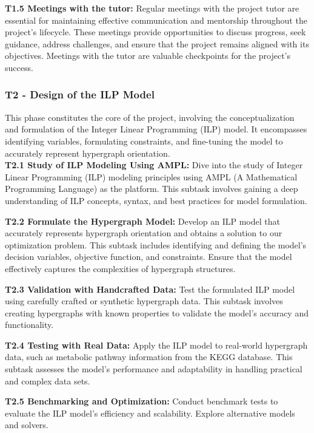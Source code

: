         \textbf{T1.5 Meetings with the tutor:}
        Regular meetings with the project tutor are essential for maintaining effective communication and mentorship throughout the project's lifecycle. These meetings provide opportunities to discuss progress, seek guidance, address challenges, and ensure that the project remains aligned with its objectives. Meetings with the tutor are valuable checkpoints for the project's success.
        

    \subsubsection{T2 - Design of the ILP Model}
        This phase constitutes the core of the project, involving the conceptualization and formulation of the Integer Linear Programming (ILP) model. It encompasses identifying variables, formulating constraints, and fine-tuning the model to accurately represent hypergraph orientation.\\
        
        \textbf{T2.1 Study of ILP Modeling Using AMPL:}
        Dive into the study of Integer Linear Programming (ILP) modeling principles using AMPL (A Mathematical Programming Language) as the platform. This subtask involves gaining a deep understanding of ILP concepts, syntax, and best practices for model formulation.
        
        \textbf{T2.2 Formulate the Hypergraph Model:}
        Develop an ILP model that accurately represents hypergraph orientation and obtains a solution to our optimization problem. This subtask includes identifying and defining the model's decision variables, objective function, and constraints. Ensure that the model effectively captures the complexities of hypergraph structures.
        
        \textbf{T2.3 Validation with Handcrafted Data:}
        Test the formulated ILP model using carefully crafted or synthetic hypergraph data. This subtask involves creating hypergraphs with known properties to validate the model's accuracy and functionality. 
        
        \textbf{T2.4 Testing with Real Data:}
        Apply the ILP model to real-world hypergraph data, such as metabolic pathway information from the KEGG database. This subtask assesses the model's performance and adaptability in handling practical and complex data sets.
        
        \textbf{T2.5 Benchmarking and Optimization:}
        Conduct benchmark tests to evaluate the ILP model's efficiency and scalability. Explore alternative models and solvers.

